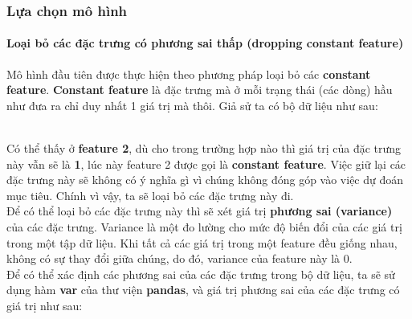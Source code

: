 \documentclass{report}
\begin{document}
    \subsubsection{Lựa chọn mô hình}
        \paragraph{Loại bỏ các đặc trưng có phương sai thấp (dropping constant feature)}
    Mô hình đầu tiên được thực hiện theo phương pháp loại bỏ các \textbf{constant feature}. \textbf{Constant feature} là đặc trưng mà ở mỗi trạng thái (các dòng) hầu như đưa ra chỉ duy nhất 1 giá trị mà thôi. Giả sử ta có bộ dữ liệu như sau:
\begin{table}[h]
    \centering
    \end{table}\\
    Có thể thấy ở \textbf{feature 2}, dù cho trong trường hợp nào thì giá trị của đặc trưng này vẫn sẽ là \textbf{1}, lúc này feature 2 được gọi là \textbf{constant feature}. Việc giữ lại các đặc trưng này sẽ không có ý nghĩa gì vì chúng không đóng góp vào việc dự đoán mục tiêu. Chính vì vậy, ta sẽ loại bỏ các đặc trưng này đi.\\

    Để có thể loại bỏ các đặc trưng này thì sẽ xét giá trị \textbf{phương sai (variance)} của các đặc trưng. Variance là một đo lường cho mức độ biến đổi của các giá trị trong một tập dữ liệu. Khi tất cả các giá trị trong một feature đều giống nhau, không có sự thay đổi giữa chúng, do đó, variance của feature này là 0.\\

    Để có thể xác định các phương sai của các đặc trưng trong bộ dữ liệu, ta sẽ sử dụng hàm \textbf{var} của thư viện \textbf{pandas}, và giá trị phương sai của các đặc trưng có giá trị như sau: 
\end{document}
